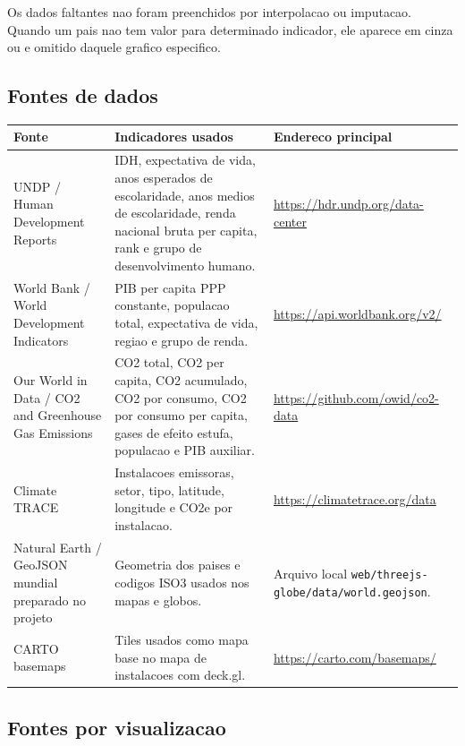 \documentclass[12pt,a4paper]{article}
\begin{document}
Os dados faltantes nao foram preenchidos por interpolacao ou imputacao. Quando um pais nao tem valor para determinado indicador, ele aparece em cinza ou e omitido daquele grafico especifico.

\subsection{Fontes de dados}

\begin{longtable}{>{\raggedright\arraybackslash}p{3.3cm}>{\raggedright\arraybackslash}p{5.4cm}>{\raggedright\arraybackslash}p{5.4cm}}
\toprule
\textbf{Fonte} & \textbf{Indicadores usados} & \textbf{Endereco principal} \\
\midrule
UNDP / Human Development Reports & IDH, expectativa de vida, anos esperados de escolaridade, anos medios de escolaridade, renda nacional bruta per capita, rank e grupo de desenvolvimento humano. & \url{https://hdr.undp.org/data-center} \\
World Bank / World Development Indicators & PIB per capita PPP constante, populacao total, expectativa de vida, regiao e grupo de renda. & \url{https://api.worldbank.org/v2/} \\
Our World in Data / CO2 and Greenhouse Gas Emissions & CO2 total, CO2 per capita, CO2 acumulado, CO2 por consumo, CO2 por consumo per capita, gases de efeito estufa, populacao e PIB auxiliar. & \url{https://github.com/owid/co2-data} \\
Climate TRACE & Instalacoes emissoras, setor, tipo, latitude, longitude e CO2e por instalacao. & \url{https://climatetrace.org/data} \\
Natural Earth / GeoJSON mundial preparado no projeto & Geometria dos paises e codigos ISO3 usados nos mapas e globos. & Arquivo local \texttt{web/threejs-globe/data/world.geojson}. \\
CARTO basemaps & Tiles usados como mapa base no mapa de instalacoes com deck.gl. & \url{https://carto.com/basemaps/} \\
\bottomrule
\end{longtable}

\subsection{Fontes por visualizacao}
\end{document}
